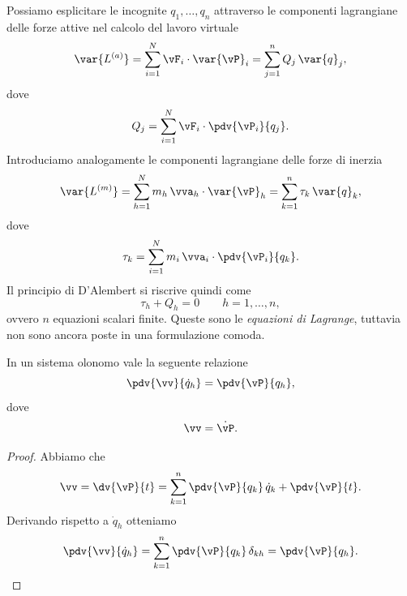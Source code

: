 Possiamo esplicitare le incognite $q_1, \dots, q_n$ attraverso le componenti lagrangiane delle forze attive nel calcolo del lavoro virtuale
\begin{equation*}
    \var{L^{(a)}} = \sum_{i=1}^N \vF_i\cdot \var{\vP}_i = \sum_{j=1}^n Q_j\,\var{q}_j,
\end{equation*} dove
\begin{equation*}
    Q_j = \sum_{i=1}^N \vF_i\cdot \pdv{\vP_i}{q_j}.
\end{equation*}
Introduciamo analogamente le componenti lagrangiane delle forze di inerzia
\begin{equation*}
    \var{L^{(m)}} = \sum_{h=1}^N m_h\,\vva_h\cdot \var{\vP}_h = \sum_{k=1}^n \tau_k\,\var{q}_k,
\end{equation*}
dove \begin{equation*}
    \tau_k = \sum_{i=1}^N m_i\,\vva_i\cdot \pdv{\vP_i}{q_k}.
\end{equation*}
Il principio di D'Alembert si riscrive quindi come
\begin{equation*}
    \tau_h + Q_h = 0 \qquad h = 1, \dots, n,
\end{equation*}
ovvero $n$ equazioni scalari finite. Queste sono le \emph{equazioni di Lagrange}, tuttavia non sono ancora poste in una formulazione comoda.

\begin{lemma}
    In un sistema olonomo vale la seguente relazione
    \begin{equation*}
        \pdv{\vv}{\dot{q}_h} = \pdv{\vP}{q_h},
    \end{equation*}
    dove
    \begin{equation*}
        \vv = \dot{\vP}.
    \end{equation*}
\end{lemma}
\begin{proof}
    Abbiamo che
    \begin{equation*}
        \vv = \dv{\vP}{t} = \sum_{k=1}^n \pdv{\vP}{q_k}\,\dot{q}_k + \pdv{\vP}{t}.
    \end{equation*}
    Derivando rispetto a $\dot{q}_h$ otteniamo
    \begin{equation*}
        \pdv{\vv}{\dot{q}_h} = \sum_{k=1}^n \pdv{\vP}{q_k}\,\delta_{kh} = \pdv{\vP}{q_h}.
    \end{equation*}
\end{proof}

